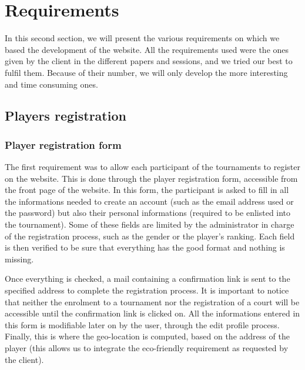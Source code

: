 \section{Requirements}
\label{sec:Requirements}


In this second section, we will present the various requirements on which we
based the development of the website. All the requirements used were the ones
given by the client in the different papers and sessions, and we tried our best
to fulfil them. Because of their number, we will only develop the more
interesting and time consuming ones.

\subsection{Players registration}
\label{sub:Players registration}

\subsubsection{Player registration form}
\label{subs:Registration form}


The first requirement was to allow each participant of the tournaments to
register on the website. This is done through the player registration form,
accessible from the front page of the website. In this form, the participant is
asked to fill in all the informations needed to create an account (such as the
email address used or the password) but also their personal informations
(required to be enlisted into the tournament). Some of these fields are limited
by the administrator in charge of the registration process, such as the gender
or the player's ranking. Each field is then verified to be sure that everything
has the good format and nothing is missing. \newline

Once everything is checked, a mail containing a confirmation link is sent to
the specified address to complete the registration process. It is important to
notice that neither the enrolment to a tournament nor the registration of a
court will be accessible until the confirmation link is clicked on. All the
informations entered in this form is modifiable later on by the user, through
the edit profile process. Finally, this is where the geo-location is computed,
based on the address of the player (this allows us to integrate the
eco-friendly requirement as requested by the client). \newline

